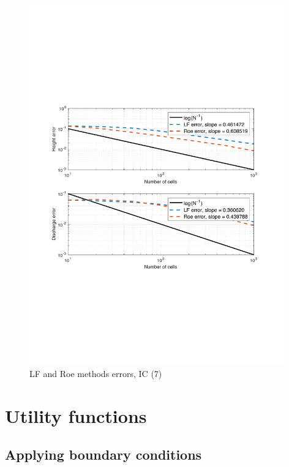 \documentclass[11pt,a4paper]{article}
\renewcommand{\thesubsection}{\thesection.\alph{subsection}}
\newcommand\blankpage{%
    \null
    \newpage}
\begin{document}
\begin{figure}[!htb]
    \centering
    \includegraphics[width=11cm]{pictures/IC_3_error.pdf}
    \caption{LF and Roe methods errors, IC (7)}
    \label{fig:IC_4_errors}
\end{figure}





\afterpage{\blankpage}
\afterpage{\blankpage}
\afterpage{\blankpage}
\afterpage{\blankpage}
\afterpage{\blankpage}

\newpage
\appendix
\renewcommand{\thesubsection}{\thesection.\arabic{subsection}}
\lstset{inputpath=m}

\section{Utility functions}\label{utility}

\subsection{Applying boundary conditions}\label{BC}

\end{document}
